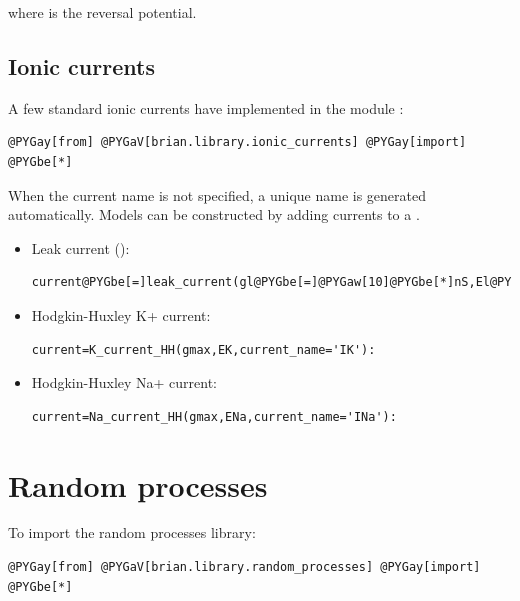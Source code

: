 \documentclass[letterpaper,10pt]{manual}
\begin{document}
where  is the reversal potential.


\subsection{Ionic currents}

A few standard ionic currents have implemented in the module :

\begin{Verbatim}[commandchars=@\[\]]
@PYGay[from] @PYGaV[brian.library.ionic_currents] @PYGay[import] @PYGbe[*]
\end{Verbatim}

When the current name is not specified,
a unique name is generated automatically. Models can be constructed by adding currents to a
.
\begin{itemize}
\item {} 
Leak current ():

\begin{Verbatim}[commandchars=@\[\]]
current@PYGbe[=]leak_current(gl@PYGbe[=]@PYGaw[10]@PYGbe[*]nS,El@PYGbe[=]@PYGbe[-]@PYGaw[70]@PYGbe[*]mV,current_name@PYGbe[=]@PYGad[']@PYGad[I]@PYGad['])
\end{Verbatim}

\item {} 
Hodgkin-Huxley K+ current:

\begin{Verbatim}[commandchars=@\[\]]
current=K_current_HH(gmax,EK,current_name='IK'):
\end{Verbatim}

\item {} 
Hodgkin-Huxley Na+ current:

\begin{Verbatim}[commandchars=@\[\]]
current=Na_current_HH(gmax,ENa,current_name='INa'):
\end{Verbatim}

\end{itemize}

\resetcurrentobjects


\section{Random processes}

To import the random processes library:

\begin{Verbatim}[commandchars=@\[\]]
@PYGay[from] @PYGaV[brian.library.random_processes] @PYGay[import] @PYGbe[*]
\end{Verbatim}
\end{document}
